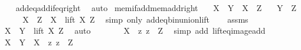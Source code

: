 \begin{isabellebody}
%
\isadelimproof
\ \ %
\endisadelimproof
%
\isatagproof
{}\isamarkupfalse%
\ add{\isacharunderscore}{\kern0pt}eq{\isacharunderscore}{\kern0pt}add{\isacharunderscore}{\kern0pt}if{\isacharunderscore}{\kern0pt}eq{\isacharunderscore}{\kern0pt}right\ \isamarkupfalse%
\ auto%
\endisatagproof
{\isafoldproof}%
%
\isadelimproof
\isanewline
%
\endisadelimproof
\isanewline
{}\isamarkupfalse%
\ mem{\isacharunderscore}{\kern0pt}if{\isacharunderscore}{\kern0pt}add{\isacharunderscore}{\kern0pt}mem{\isacharunderscore}{\kern0pt}add{\isacharunderscore}{\kern0pt}right{\isacharcolon}{\kern0pt}\isanewline
\ \ \ {\isachardoublequoteopen}X\ {\isacharplus}{\kern0pt}\ Y\ {\isasymin}\ X\ {\isacharplus}{\kern0pt}\ Z{\isachardoublequoteclose}\isanewline
\ \ \ {\isachardoublequoteopen}Y\ {\isasymin}\ Z{\isachardoublequoteclose}\isanewline
%
\isadelimproof
%
\endisadelimproof
%
\isatagproof
{}\isamarkupfalse%
\ {\isacharminus}{\kern0pt}\isanewline
\ \ \isamarkupfalse%
\ {\isachardoublequoteopen}X\ {\isacharplus}{\kern0pt}\ Z\ {\isacharequal}{\kern0pt}\ X\ {\isasymunion}\ lift\ X\ Z{\isachardoublequoteclose}\ \isamarkupfalse%
\ {\isacharparenleft}{\kern0pt}simp\ only{\isacharcolon}{\kern0pt}\ add{\isacharunderscore}{\kern0pt}eq{\isacharunderscore}{\kern0pt}bin{\isacharunderscore}{\kern0pt}union{\isacharunderscore}{\kern0pt}lift{\isacharparenright}{\kern0pt}\isanewline
\ \ \isamarkupfalse%
\ assms\ \isamarkupfalse%
\ {\isachardoublequoteopen}X\ {\isacharplus}{\kern0pt}\ Y\ {\isasymin}\ lift\ X\ Z{\isachardoublequoteclose}\ \isamarkupfalse%
\ auto\isanewline
\ \ \isamarkupfalse%
\ \isamarkupfalse%
\ {\isachardoublequoteopen}{\isachardot}{\kern0pt}{\isachardot}{\kern0pt}{\isachardot}{\kern0pt}\ {\isacharequal}{\kern0pt}\ {\isacharbraceleft}{\kern0pt}X\ {\isacharplus}{\kern0pt}\ z{\isacharbar}{\kern0pt}\ z\ {\isasymin}\ Z{\isacharbraceright}{\kern0pt}{\isachardoublequoteclose}\ \isamarkupfalse%
\ {\isacharparenleft}{\kern0pt}simp\ add{\isacharcolon}{\kern0pt}\ lift{\isacharunderscore}{\kern0pt}eq{\isacharunderscore}{\kern0pt}image{\isacharunderscore}{\kern0pt}add{\isacharparenright}{\kern0pt}\isanewline
\ \ \isamarkupfalse%
\ \isamarkupfalse%
\ {\isachardoublequoteopen}X\ {\isacharplus}{\kern0pt}\ Y\ {\isasymin}\ {\isacharbraceleft}{\kern0pt}X\ {\isacharplus}{\kern0pt}\ z{\isacharbar}{\kern0pt}\ z\ {\isasymin}\ Z{\isacharbraceright}{\kern0pt}{\isachardoublequoteclose}\ \isacommand{{\isachardot}{\kern0pt}}\isamarkupfalse%

\end{isabellebody}
